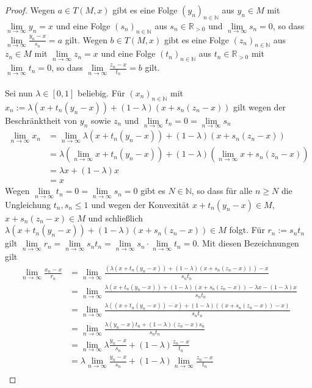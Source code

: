 \begin{compactenum}[(i)]
\begin{proof}
Wegen $a\in T(M,x)$ gibt es eine Folge $(y_n)_{n\in\mathbb N}$ aus $y_n\in M$ mit $\lim\limits_{n\to\infty} y_n=x$ und eine Folge $(s_n)_{n\in\mathbb N}$ aus $s_n\in\mathbb R_{>0}$ und $\lim\limits_{n\to\infty}s_n = 0$, so dass $\lim\limits_{n\to\infty} \frac{y_n-x}{s_n}=a$ gilt. Wegen $b\in T(M,x)$ gibt es eine Folge $(z_n)_{n\in\mathbb N}$ aus $z_n\in M$ mit $\lim\limits_{n\to\infty} z_n=x$ und eine Folge $(t_n)_{n\in\mathbb N}$ aus $t_n\in\mathbb R_{>0}$ mit $\lim\limits_{n\to\infty}t_n = 0$, so dass $\lim\limits_{n\to\infty} \frac{z_n-x}{t_n}=b$ gilt.\\\\
Sei nun $\lambda\in[0,1]$ beliebig. Für $(x_n)_{n\in\mathbb N}$ mit $x_n:=\lambda(x+t_n(y_n-x))+(1-\lambda)(x+s_n(z_n-x))$ gilt wegen der Beschränktheit von $y_n$ sowie $z_n$ und $\lim\limits_{n\to\infty}t_n = 0=\lim\limits_{n\to\infty}s_n$
\begin{align*}
\lim\limits_{n\to\infty} x_n &=\lim\limits_{n\to\infty} \lambda(x+t_n(y_n-x))+(1-\lambda)(x+s_n(z_n-x))\\&=\lambda(\lim\limits_{n\to\infty}x+t_n(y_n-x))+(1-\lambda)(\lim\limits_{n\to\infty} x+s_n(z_n-x))\\&=\lambda x+(1-\lambda)x&\\
&=x
\end{align*}
Wegen $\lim\limits_{n\to\infty} t_n=0=\lim\limits_{n\to\infty} s_n=0$ gibt es $N\in\mathbb N$, so dass für alle $n\geq N$ die Ungleichung $t_n,s_n\leq 1$ und wegen der Konvexität $x+t_n(y_n-x)\in M$,  $x+s_n(z_n-x)\in M$ und schließlich $\lambda(x+t_n(y_n-x))+(1-\lambda)(x+s_n(z_n-x))\in M$ folgt. Für $r_n:=s_nt_n$ gilt $\lim\limits_{n\to\infty} r_n=\lim\limits_{n\to\infty} s_nt_n=\lim\limits_{n\to\infty} s_n\cdot \lim\limits_{n\to\infty}t_n=0$. Mit diesen Bezeichnungen gilt \begin{align*}\lim\limits_{n\to\infty}\frac{x_n-x}{r_n}&=\lim\limits_{n\to\infty}\frac{(\lambda(x+t_n(y_n-x))+(1-\lambda)(x+s_n(z_n-x)))-x}{s_nt_n}\\&=\lim\limits_{n\to\infty}\frac{\lambda(x+t_n(y_n-x))+(1-\lambda)(x+s_n(z_n-x))-\lambda x-(1-\lambda)x}{s_nt_n}\\&=\lim\limits_{n\to\infty}\frac{\lambda((x+t_n(y_n-x))-x)+(1-\lambda)((x+s_n(z_n-x))-x)}{s_nt_n}\\&=\lim\limits_{n\to\infty}\frac{\lambda(y_n-x)t_n+(1-\lambda)(z_n-x)s_n}{s_nt_n}\\&=\lim\limits_{n\to\infty}\lambda \frac{y_n-x}{s_n}+(1-\lambda)\frac{z_n-x}{t_n}\\&=\lambda \lim\limits_{n\to\infty}\frac{y_n-x}{s_n}+(1-\lambda)\lim\limits_{n\to\infty}\frac{z_n-x}{t_n}\\

\end{align*}
\end{proof}
\end{compactenum}
